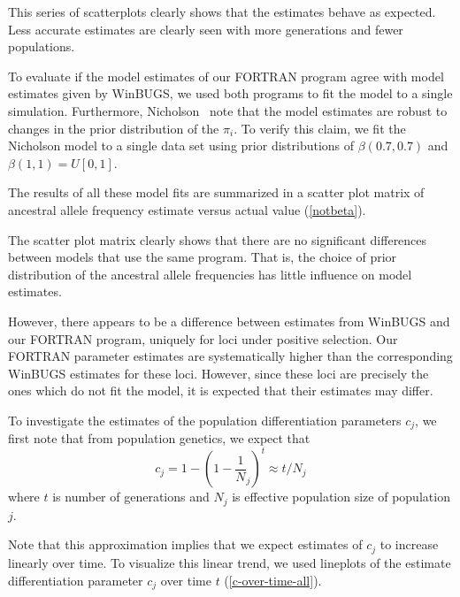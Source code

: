 \documentclass[a4paper,12pt]{article}
\begin{document}
This series of scatterplots clearly shows that the estimates behave as
expected. Less accurate estimates are clearly seen with more
generations and fewer populations.

To evaluate if the model estimates of our FORTRAN program agree with
model estimates given by WinBUGS, we used both programs to fit the
model to a single simulation. Furthermore, Nicholson \etal\ note that
the model estimates are robust to changes in the prior distribution of
the $\pi_i$. To verify this claim, we fit the Nicholson model to a
single data set using prior distributions of $\beta(0.7,0.7)$ and
$\beta(1,1)=U[0,1]$.

The results of all these model fits are summarized in a scatter plot
matrix of ancestral allele frequency estimate versus actual value
(\autoref{notbeta}).


The scatter plot matrix clearly shows that there are no significant
differences between models that use the same program. That is, the
choice of prior distribution of the ancestral allele frequencies has
little influence on model estimates.

However, there appears to be a difference between estimates from
WinBUGS and our FORTRAN program, uniquely for loci under positive
selection. Our FORTRAN parameter estimates are systematically higher
than the corresponding WinBUGS estimates for these loci. However,
since these loci are precisely the ones which do not fit the model, it
is expected that their estimates may differ.

To investigate the estimates of the population differentiation
parameters $c_j$, we first note that from population genetics, we
expect that
\begin{equation}
  \label{c}
 c_j = 1 - (1 - \frac 1 N_j)^t\approx t/N_j  
\end{equation}
where $t$ is number of generations and $N_j$ is effective population
size of population $j$.

Note that this approximation implies that we expect estimates of $c_j$
to increase linearly over time. To visualize this linear trend, we
used lineplots of the estimate differentiation parameter $c_j$ over
time $t$ (\autoref{c-over-time-all}).
\end{document}

